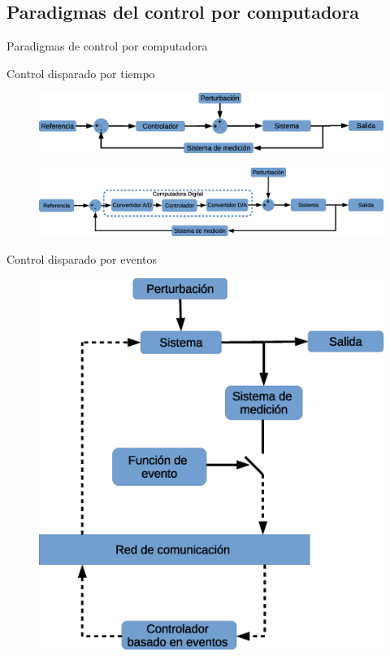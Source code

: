 \subsection{Paradigmas del control por computadora}
\begin{frame}[shrink=30]{Paradigmas de control por computadora}
	\begin{block}{Control disparado por tiempo}
		\begin{figure}
			\begin{center}
				\includegraphics[scale=0.35]{Introduccion/EsqCtrlDispTiempCont.eps}
			\end{center}
		\end{figure}
		\begin{figure}
			\begin{center}
				\includegraphics[scale=0.35]{Introduccion/EsqCtrlDispTiempDisc.eps} 
			\end{center}
		\end{figure}
	\end{block}
	\begin{block}{Control disparado por eventos}
		\begin{figure}
			\begin{center}
				\includegraphics[scale=0.35]{Introduccion/EsqCtrlDispEvent.eps}  

\end{center}
\end{figure}
\end{block}
\end{frame}
